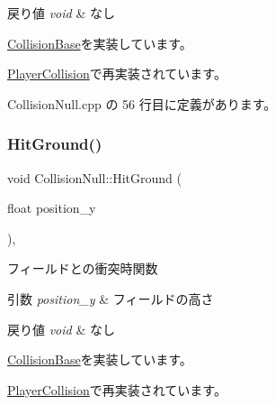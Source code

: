 \begin{DoxyRetVals}{戻り値}
{\em void} & なし \\
\hline
\end{DoxyRetVals}


\mbox{\hyperlink{class_collision_base_a610bcd9fec0c561949cd58fd01cd9a77}{Collision\+Base}}を実装しています。



\mbox{\hyperlink{class_player_collision_aed2775b2a14b6868160d6668ed928f8d}{Player\+Collision}}で再実装されています。



 Collision\+Null.\+cpp の 56 行目に定義があります。

\mbox{\label{class_collision_null_ac5645bca5f03262d1918e2ff8348440d}} 
\subsubsection{\texorpdfstring{Hit\+Ground()}{HitGround()}}
{\footnotesize\ttfamily void Collision\+Null\+::\+Hit\+Ground (\begin{DoxyParamCaption}\item[{float}]{position\+\_\+y }\end{DoxyParamCaption})\hspace{0.3cm}{\ttfamily [override]}, {\ttfamily [virtual]}}



フィールドとの衝突時関数 


\begin{DoxyParams}{引数}
{\em position\+\_\+y} & フィールドの高さ \\
\hline
\end{DoxyParams}

\begin{DoxyRetVals}{戻り値}
{\em void} & なし \\
\hline
\end{DoxyRetVals}


\mbox{\hyperlink{class_collision_base_a48c9d1d9e4286cde5054d4d2aa70bdd8}{Collision\+Base}}を実装しています。



\mbox{\hyperlink{class_player_collision_a3522ce17b1e1752f2737c2243582ecb0}{Player\+Collision}}で再実装されています。



